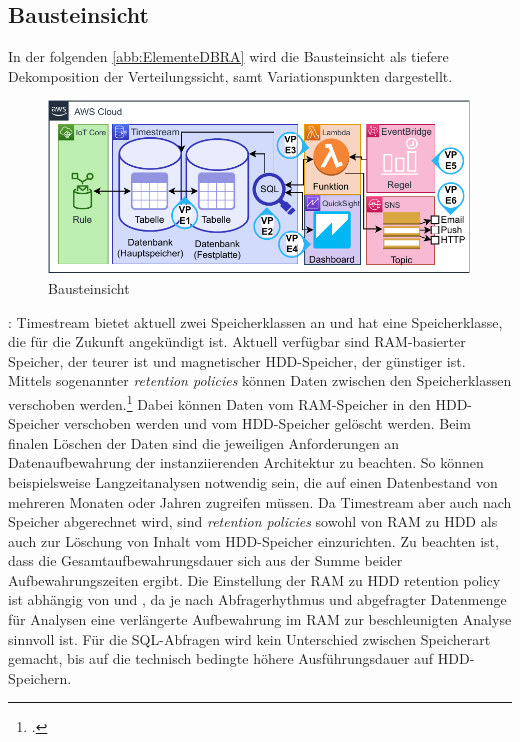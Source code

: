 \subsection{Bausteinsicht}
In der folgenden \autoref{abb:ElementeDBRA} wird die Bausteinsicht als tiefere Dekomposition der Verteilungssicht, samt Variationspunkten dargestellt.
\begin{figure}[H]
\centering
\includegraphics[width=\textwidth]{graphics/DB-RA-Elements.pdf}
\caption{Bausteinsicht}
\label{abb:ElementeDBRA}
\end{figure}

: Timestream bietet aktuell zwei Speicherklassen an und hat eine Speicherklasse, die für die Zukunft angekündigt ist. Aktuell verfügbar sind \ac{RAM}-basierter Speicher, der teurer ist und magnetischer \ac{HDD}-Speicher, der günstiger ist. Mittels sogenannter \textit{retention policies} können Daten zwischen den Speicherklassen verschoben werden.\footcite[Vgl. auch im Folgenden][]{AmazonWebServicesInc..o.J.bp} Dabei können Daten vom \ac{RAM}-Speicher in den \ac{HDD}-Speicher verschoben werden und vom \ac{HDD}-Speicher gelöscht werden. Beim finalen Löschen der Daten sind die jeweiligen Anforderungen an Datenaufbewahrung der instanziierenden Architektur zu beachten. So können beispielsweise Langzeitanalysen notwendig sein, die auf einen Datenbestand von mehreren Monaten oder Jahren zugreifen müssen. Da Timestream aber auch nach Speicher abgerechnet wird, sind \textit{retention policies} sowohl von \ac{RAM} zu \ac{HDD} als auch zur Löschung von Inhalt vom \ac{HDD}-Speicher einzurichten. Zu beachten ist, dass die Gesamtaufbewahrungsdauer sich aus der Summe beider Aufbewahrungszeiten ergibt. Die Einstellung der \ac{RAM} zu \ac{HDD} retention policy ist abhängig von  und , da je nach Abfragerhythmus und abgefragter Datenmenge für Analysen eine verlängerte Aufbewahrung im \ac{RAM} zur beschleunigten Analyse sinnvoll ist. Für die \ac{SQL}-Abfragen wird kein Unterschied zwischen Speicherart gemacht, bis auf die technisch bedingte höhere Ausführungsdauer auf \ac{HDD}-Speichern.

